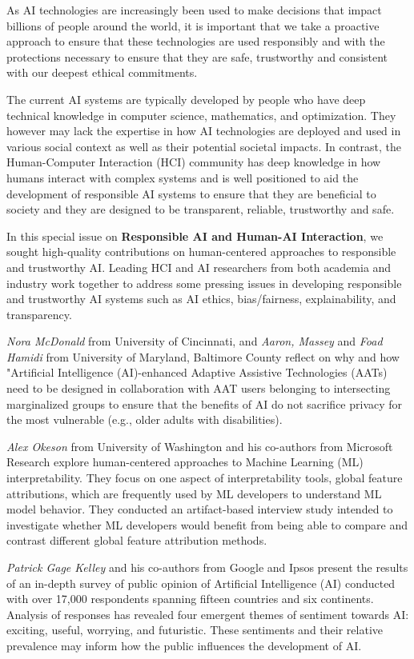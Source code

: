 \documentclass[11pt]{article}
\begin{document}
As AI technologies are increasingly been used to make decisions that impact billions of people around the world,  it is important that we take a proactive approach to ensure that these technologies are used responsibly and with the protections necessary to ensure that they are safe, trustworthy and consistent with our deepest ethical commitments. 
 
The current AI systems are typically developed by people who have deep technical knowledge in computer science, mathematics, and optimization. They however may lack the expertise in how AI technologies are deployed and used in various social context as well as their potential societal impacts.  In contrast, the Human-Computer Interaction (HCI) community has deep knowledge in how humans interact with complex systems and is well positioned to aid the development of responsible AI systems to ensure that they are beneficial to society and they are designed to be transparent, reliable, trustworthy and safe.  

In this special issue on \textbf{Responsible AI and Human-AI Interaction}, we sought high-quality contributions on human-centered approaches to responsible and trustworthy AI. Leading HCI and AI researchers from both academia and industry work together to address some pressing issues in developing responsible and trustworthy AI systems such as AI ethics, bias/fairness, explainability, and transparency. 
  
\textit{Nora McDonald} from University of Cincinnati, and \textit{Aaron, Massey} and \textit{Foad Hamidi} from University of Maryland, Baltimore County reflect on why and how "Artificial Intelligence (AI)-enhanced Adaptive Assistive Technologies (AATs) need to be designed in collaboration with AAT users belonging to intersecting marginalized groups to ensure that the benefits of AI do not sacrifice privacy for the most vulnerable (e.g., older adults with disabilities).   

\textit{Alex Okeson} from University of Washington and his co-authors from Microsoft Research explore human-centered approaches to Machine Learning (ML) interpretability. They focus on one aspect of interpretability tools, global feature attributions, which are frequently used by ML developers to understand ML model behavior. They conducted an artifact-based interview study intended to investigate whether ML developers would benefit from being able to compare and contrast different global feature attribution methods.

\textit{Patrick Gage Kelley} and his co-authors from Google and Ipsos present the results of an in-depth survey of public opinion of Artificial Intelligence (AI) conducted with over 17,000 respondents spanning fifteen countries and six continents. Analysis of responses has revealed four emergent themes of sentiment towards AI: exciting, useful, worrying, and futuristic. These sentiments and their relative prevalence may inform how the public influences the development of AI.   
\end{document}
